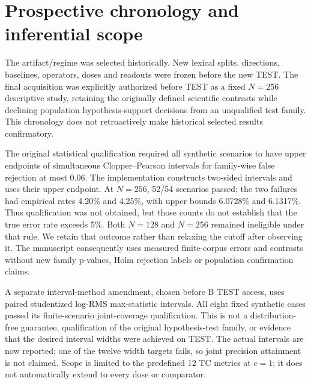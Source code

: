 \section{Prospective chronology and inferential scope}\label{app:qualification}
The artifact/regime was selected historically. New lexical splits, directions, baselines, operators, doses and readouts were frozen before the new TEST. The final acquisition was explicitly authorized before TEST as a fixed $N=256$ descriptive study, retaining the originally defined scientific contrasts while declining population hypothesis-support decisions from an unqualified test family. This chronology does not retroactively make historical selected results confirmatory.

The original statistical qualification required all synthetic scenarios to have upper endpoints of simultaneous Clopper--Pearson intervals for family-wise false rejection at most 0.06. The implementation constructs two-sided intervals and uses their upper endpoint. At $N=256$, 52/54 scenarios passed; the two failures had empirical rates 4.20\% and 4.25\%, with upper bounds 6.0728\% and 6.1317\%. Thus qualification was not obtained, but those counts do not establish that the true error rate exceeds 5\%. Both $N=128$ and $N=256$ remained ineligible under that rule. We retain that outcome rather than relaxing the cutoff after observing it. The manuscript consequently uses measured finite-corpus errors and contrasts without new family p-values, Holm rejection labels or population confirmation claims.

A separate interval-method amendment, chosen before B TEST access, uses paired studentized log-RMS max-statistic intervals. All eight fixed synthetic cases passed its finite-scenario joint-coverage qualification. This is not a distribution-free guarantee, qualification of the original hypothesis-test family, or evidence that the desired interval widths were achieved on TEST. The actual intervals are now reported; one of the twelve width targets fails, so joint precision attainment is not claimed. Scope is limited to the predefined 12 TC metrics at $c=1$; it does not automatically extend to every dose or comparator.


